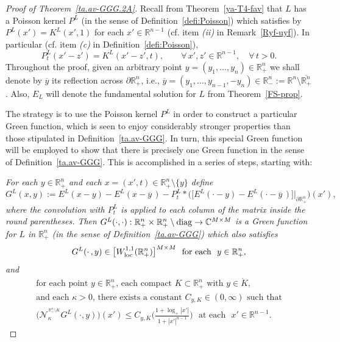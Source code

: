 \documentclass[11pt,reqno]{amsart}
\numberwithin{equation}{section}
\theoremstyle{remark}
\begin{document}
\vskip 0.08in
\begin{proof}[Proof of Theorem~\ref{ta.av-GGG.2A}]
Recall from Theorem~\ref{ya-T4-fav} that $L$ has a Poisson kernel $P^L$ 
(in the sense of Definition~\ref{defi:Poisson}) which satisfies by $P^L(x')=K^L(x',1)$ 
for each $x'\in{\mathbb{R}}^{n-1}$ (cf. item {\it (ii)} in Remark~\ref{Ryf-uyf}).
In particular (cf. item {\it (c)} in Definition~\ref{defi:Poisson}), 
%
\begin{equation}\label{tarad-tre445}
P^L_t(x'-z')=K^L(x'-z',t),\qquad\forall\,x',z'\in{\mathbb{R}}^{n-1},\quad\forall\,t>0.
\end{equation}
%
Throughout the proof, given an arbitrary point $y=(y_1,\dots,y_n)\in\mathbb{R}^n_+$
we shall denote by $\overline{y}$ its reflection across $\partial\mathbb{R}^n_+$, i.e., 
$\overline{y}=(y_1,\dots,y_{n-1},-y_n)\in\mathbb{R}^n_{-}:=\mathbb{R}^n\setminus\overline{\mathbb{R}^n_{+}}$. 
Also, $E_{L}$ will denote the fundamental solution for $L$ from Theorem~\ref{FS-prop}.

The strategy is to use the Poisson kernel $P^L$ in order to construct a 
particular Green function, which is seen to enjoy considerably stronger 
properties than those stipulated in Definition~\ref{ta.av-GGG}. In turn, 
this special Green function will be employed to show that there is  
precisely one Green function in the sense of Definition~\ref{ta.av-GGG}.
This is accomplished in a series of steps, starting with:

\vskip 0.08in
 \textit{For each $y\in{\mathbb{R}}^n_{+}$ and each 
$x=(x',t)\in{\mathbb{R}}^n_{+}\setminus\{y\}$ define 
%
\begin{equation}\label{Ihab-Ygab673}
G^L(x,y):=E^L(x-y)-E^L(x-\overline{y}\,)
-P^L_t\ast\Big(\big[E^L(\cdot-y)-E^L(\cdot-\overline{y}\,)
\big]\big|_{\partial{\mathbb{R}}^n_{+}}\Big)(x'),
\end{equation}
%
where the convolution with $P^L_t$ is applied to each column of the matrix inside the round parentheses. 
Then $G^L(\cdot,\cdot):{\mathbb{R}}^n_{+}\times{\mathbb{R}}^n_{+}\setminus{\rm diag}\to{\mathbb{C}}^{M\times M}$ 
is a Green function for $L$ in $\mathbb{R}^n_+$ {\rm (}in the sense of Definition~\ref{ta.av-GGG}{\rm )}
which also satisfies 
%
\begin{equation}\label{GHCewd-22.RRe.2}
G^L(\cdot\,,y)\in\big[W^{1,1}_{\rm loc}({\mathbb{R}}^n_{+})\big]^{M\times M}
\,\,\text{ for each }\,\,y\in{\mathbb{R}}^n_{+},
\end{equation}
%
and
%
\begin{equation}\label{hBb-TR.D2}
\begin{array}{c}
\text{for each point $y\in{\mathbb{R}}^n_{+}$, each compact $K\subset{\mathbb{R}}^n_{+}$ 
with $y\in\mathring{K}$}, 
\\[6pt]
\text{and each $\kappa>0$, there exists a constant $C_{y,K}\in(0,\infty)$ such that}
\\[10pt]
\displaystyle
\big(\mathcal{N}^{^{\,{\mathbb{R}}^n_{+}\setminus K}}_\kappa G^L(\cdot,y)\big)(x')\leq
C_{y,K}\Big(\frac{1+\log_{+}|x'|}{1+|x'|^{n-1}}\Big)\,\,\text{ at each }\,\,x'\in{\mathbb{R}}^{n-1}.
\end{array}
\end{equation}
}
\vskip 0.08in


\end{proof}
\end{document}
